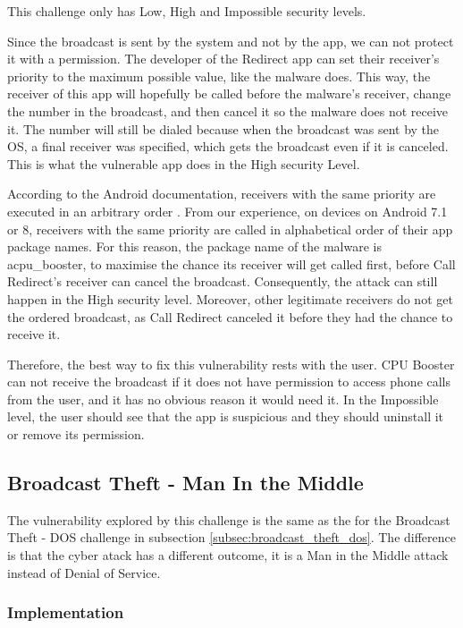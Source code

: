     This challenge only has Low, High and Impossible security levels.
        
    Since the broadcast is sent by the system and not by the app, we can not protect it with a permission. The developer of the Redirect app can set their receiver's priority to the maximum possible value, like the malware does. This way, the receiver of this app will hopefully be called before the malware's receiver, change the number in the broadcast, and then cancel it so the malware does not receive it. The number will still be dialed because when the broadcast was sent by the OS, a final receiver was specified, which gets the broadcast even if it is canceled. This is what the vulnerable app does in the High security Level.

    According to the Android documentation, receivers with the same priority are executed in an arbitrary order \cite{broadcasts_overview}. From our experience, on devices on Android 7.1 or 8, receivers with the same priority are called in alphabetical order of their app package names. For this reason, the package name of the malware is acpu\_booster, to maximise the chance its receiver will get called first, before Call Redirect's receiver can cancel the broadcast. Consequently, the attack can still happen in the High security level. Moreover, other legitimate receivers do not get the ordered broadcast, as Call Redirect canceled it before they had the chance to receive it.

    Therefore, the best way to fix this vulnerability rests with the user. CPU Booster can not receive the broadcast if it does not have permission to access phone calls from the user, and it has no obvious reason it would need it. In the Impossible level, the user should see that the app is suspicious and they should uninstall it or remove its permission. 
    
    \subsection{Broadcast Theft - Man In the Middle}
        \label{subsec:broadcast_theft_mitm}
        
    The vulnerability explored by this challenge is the same as the for the Broadcast Theft - DOS challenge in subsection \ref{subsec:broadcast_theft_dos}. The difference is that the cyber atack has a different outcome, it is a Man in the Middle attack instead of Denial of Service.
    
    \subsubsection{Implementation}
        \label{subsubsec:broadcast_theft_mitm_implementation}


